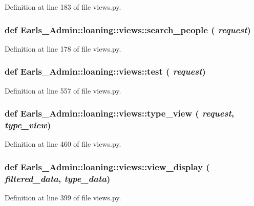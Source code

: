 Definition at line 183 of file views.py.\hypertarget{namespaceEarls__Admin_1_1loaning_1_1views_02fd21901fc8f89eb476084adef8e337}{
\subsubsection[search\_\-people]{\setlength{\rightskip}{0pt plus 5cm}def Earls\_\-Admin::loaning::views::search\_\-people ( {\em request})}}
\label{namespaceEarls__Admin_1_1loaning_1_1views_02fd21901fc8f89eb476084adef8e337}




Definition at line 178 of file views.py.\hypertarget{namespaceEarls__Admin_1_1loaning_1_1views_030b87ca7f36b48e7bc4ca82ecfff1d3}{
\subsubsection[test]{\setlength{\rightskip}{0pt plus 5cm}def Earls\_\-Admin::loaning::views::test ( {\em request})}}
\label{namespaceEarls__Admin_1_1loaning_1_1views_030b87ca7f36b48e7bc4ca82ecfff1d3}




Definition at line 557 of file views.py.\hypertarget{namespaceEarls__Admin_1_1loaning_1_1views_81305e166b52f601c3577187de33a879}{
\subsubsection[type\_\-view]{\setlength{\rightskip}{0pt plus 5cm}def Earls\_\-Admin::loaning::views::type\_\-view ( {\em request}, \/   {\em type\_\-view})}}
\label{namespaceEarls__Admin_1_1loaning_1_1views_81305e166b52f601c3577187de33a879}




Definition at line 460 of file views.py.\hypertarget{namespaceEarls__Admin_1_1loaning_1_1views_4a2f0a182dc4db45644feda0e5bc4d79}{
\subsubsection[view\_\-display]{\setlength{\rightskip}{0pt plus 5cm}def Earls\_\-Admin::loaning::views::view\_\-display ( {\em filtered\_\-data}, \/   {\em type\_\-data})}}
\label{namespaceEarls__Admin_1_1loaning_1_1views_4a2f0a182dc4db45644feda0e5bc4d79}




Definition at line 399 of file views.py.